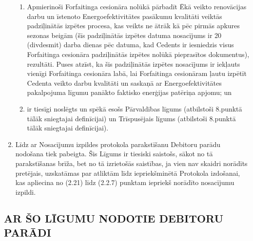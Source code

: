 \documentclass[a4paper]{article}
\begin{document}
\begin{enumerate}
\begin{enumerate}
  \item{Apmierinoši Forfaitinga cesionāra nolūkā pārbadīt Ēkā veikto renovācijas darbu un
īstenoto Energoefektivitātes pasākumu kvalitāti veiktās padziļinātās izpētes procesa, kas veikts
ne ātrāk kā pēc pirmās apkures sezonas beigām (šīs padziļinātās izpētes datuma nosacījums ir 20
(divdesmit) darba dienas pēc datuma, kad Cedents ir iesniedzis visus Forfaitinga cesionāra
padziļinātās izpētes nolūkā pieprasītos dokumentus), rezultāti. Puses atzīst, ka šis padziļinātās
izpētes nosacījums ir iekļauts vienīgi Forfaitinga cesionāra labā, lai Forfaitinga cesionāram ļautu
izpētīt Cedenta veikto darbu kvalitāti un saskaņā ar Energoefektivitātes pakalpojuma līgumu
panākto faktisko enerģijas patēriņa apjomu; un}

  \item{ir tiesīgi noslēgts un spēkā esošs Pārvaldības līgums (atbilstoši 8.punktā tālāk sniegtajai
definīcijai) un Trīspusējais līgums (atbilstoši 8.punktā tālāk sniegtajai definīcijai).}
  \end{enumerate}

\item{Līdz ar Nosacījumu izpildes protokola parakstīšanu Debitoru parādu nodošana tiek
pabeigta. Šis Līgums ir tiesiski saistošs, sākot no tā parakstīšanas brīža, bet no tā izrietošās
saistības, ja vien nav skaidri norādīts pretējais, uzskatāmas par atliktām līdz
iepriekšminētā Protokola izdošanai, kas apliecina no (2.21) līdz (2.2.7) punktam iepriekš
norādīto nosacījumu izpildi.}

\end{enumerate}

\subsection{AR ŠO LĪGUMU NODOTIE DEBITORU PARĀDI}
\end{document}
